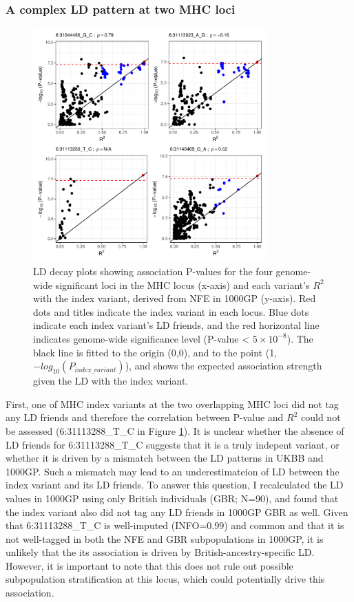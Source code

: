   \subsubsection{A complex LD pattern at two MHC loci}
  \begin{figure}[H] 
    \centering    
    \includegraphics[width=0.8\textwidth]{ukbb_ld_decay_mhc}
    \caption[Figure]{LD decay plots showing association P-values for the four genome-wide significant loci in the MHC locus (x-axis) and each variant's $R^{2}$ with the index variant, derived from NFE in 1000GP (y-axis). Red dots and titles indicate the index variant in each locus. Blue dots indicate each index variant's LD friends, and the red horizontal line indicates genome-wide significance level (P-value < $5\times10^{-8}$). The black line is fitted to the origin (0,0), and to the point (1,$-log_{10}(P_{index\_variant})$), and shows the expected association strength given the LD with the index variant.}
    \label{fig:ukbb_ld_decay_mhc}
    \end{figure}
  First, one of MHC index variants at the two overlapping MHC loci did not tag any LD friends and therefore the correlation between P-value and $R^{2}$ could not be assessed (6:31113288\_T\_C in Figure \ref{fig:ukbb_ld_decay_mhc}). It is unclear whether the absence of LD friends for 6:31113288\_T\_C suggests that it is a truly indepent variant, or whether it is driven by a mismatch between the LD patterns in UKBB and 1000GP. Such a mismatch may lead to an underestimateion of LD between the index variant and its LD friends. To answer this question, I recalculated the LD values in 1000GP using only British individuals (GBR; N=90), and found that the index variant also did not tag any LD friends in 1000GP GBR as well. Given that 6:31113288\_T\_C is well-imputed (INFO=0.99) and common and that it is not well-tagged in both the NFE and GBR subpopulations in 1000GP, it is unlikely that the its association is driven by British-ancestry-specific LD. However, it is important to note that this does not rule out possible subpopulation stratification at this locus, which could potentially drive this association. 


